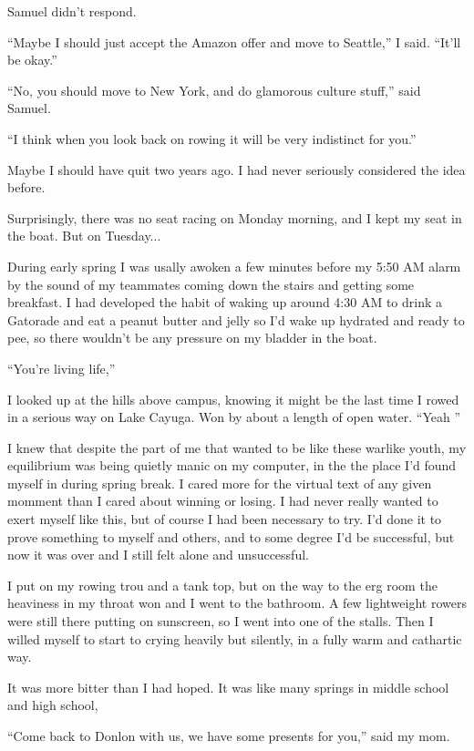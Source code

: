 Samuel didn't respond.

``Maybe I should just accept the Amazon offer and move to Seattle,'' I said.
``It'll be okay.''

``No, you should move to New York, and do glamorous culture stuff,'' said
Samuel.

``I think when you look back on rowing it will be very indistinct for you.'' 

Maybe I should have quit two years ago.  I had never seriously considered the
idea before.

Surprisingly, there was no seat racing on Monday morning, and I kept my seat in
the boat.  But on Tuesday...

During early spring I was usally awoken a few minutes before my 5:50 AM alarm by
the sound of my teammates coming down the stairs and getting some breakfast.  I
had developed the habit of waking up around 4:30 AM to drink a Gatorade and eat
a peanut butter and jelly so I'd wake up hydrated and ready to pee, so there
wouldn't be any pressure on my bladder in the boat. 

``You're living life,''

I looked up at the hills above campus, knowing it might be the last time I rowed
in a serious way on Lake Cayuga.  Won by about a length of open water.  ``Yeah
'' 

I knew that despite the part of me that wanted to be like these warlike youth,
my equilibrium was being quietly manic on my computer, in the the place I'd
found myself in during spring break.  I cared more for the virtual text of any
given momment than I cared about winning or losing.  I had never really wanted
to exert myself like this, but of course I had been necessary to try.  I'd done
it to prove something to myself and others, and to some degree I'd be
successful, but now it was over and I still felt alone and unsuccessful.

I put on my rowing trou and a tank top, but on the way to the erg room the
heaviness in my throat won and I went to the bathroom.  A few lightweight
rowers were still there putting on sunscreen, so I went into one of the stalls.
Then I willed myself to start to crying heavily but silently, in a fully warm
and cathartic way.  

It was more bitter than I had hoped.  It was like many springs in middle school
and high school, 

``Come back to Donlon with us, we have some presents for you,'' said my mom. 

